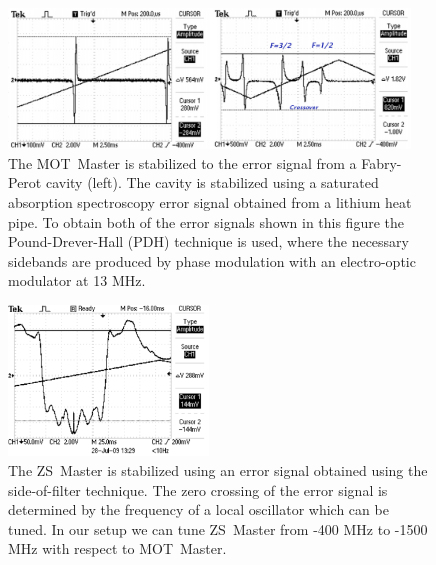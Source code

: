 \documentclass[oneside,12pt]{memoir}
\begin{document}
\begin{figure} \centering
\includegraphics[width=0.95\textwidth]{../figures/671setup/MotMaster.pdf}
\caption[Lock error signals for  671 nm MOT~Master]{\small The MOT~Master is
stabilized to the error signal from a Fabry-Perot cavity (left). The cavity is
stabilized using a saturated absorption spectroscopy error signal obtained from
a lithium heat pipe.  To obtain both of the error signals shown in this figure
the Pound-Drever-Hall (PDH) technique is used, where the necessary sidebands
are produced by phase modulation with an electro-optic modulator at 13 MHz. }
\label{fig:motmaster} \end{figure}

\begin{figure} \centering
\includegraphics[width=0.475\textwidth]{../figures/671setup/offsetlock.pdf}
\caption[Side of filter lock error signal for 671 nm ZS~Master]{\small The
ZS~Master is stabilized using an error signal obtained using the side-of-filter
technique.   The zero crossing of the error signal is determined by the
frequency of a local oscillator which can be tuned.  In our setup we can tune
ZS~Master from -400 MHz to -1500 MHz with respect to  MOT~Master.  }
\label{fig:zsmaster} \end{figure}

	
\end{document}
